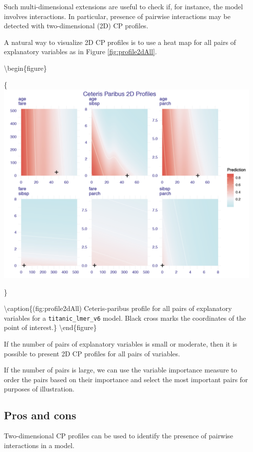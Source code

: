 \documentclass[12pt,]{krantz}
\theoremstyle{definition}
\theoremstyle{definition}
\theoremstyle{definition}
\theoremstyle{remark}
\begin{document}
Such multi-dimensional extensions are useful to check if, for instance,
the model involves interactions. In particular, presence of pairwise
interactions may be detected with two-dimensional (2D) CP profiles.

A natural way to visualize 2D CP profiles is to use a heat map for all
pairs of explanatory variables as in Figure \ref{fig:profile2dAll}.

\textbackslash{}begin\{figure\}

\{\centering \includegraphics[width=0.9\linewidth]{figure/profile_2d_all}

\}

\textbackslash{}caption\{(fig:profile2dAll) Ceteris-paribus profile for
all pairs of explanatory variables for a \texttt{titanic\_lmer\_v6}
model. Black cross marks the coordinates of the point of
interest.\}\label{fig:profile2dAll} \textbackslash{}end\{figure\}

If the number of pairs of explanatory variables is small or moderate,
then it is possible to present 2D CP profiles for all pairs of
variables.

If the number of pairs is large, we can use the variable importance
measure to order the pairs based on their importance and select the most
important pairs for purposes of illustration.

\hypertarget{pros-and-cons-2}{%
\subsection{Pros and cons}\label{pros-and-cons-2}}

Two-dimensional CP profiles can be used to identify the presence of
pairwise interactions in a model.
\end{document}
